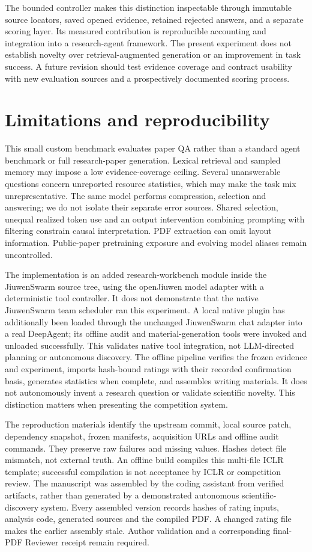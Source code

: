 \documentclass{article}
\begin{document}
The bounded controller makes this distinction inspectable through immutable source locators, saved opened evidence, retained rejected answers, and a separate scoring layer. Its measured contribution is reproducible accounting and integration into a research-agent framework. The present experiment does not establish novelty over retrieval-augmented generation or an improvement in task success. A future revision should test evidence coverage and contract usability with new evaluation sources and a prospectively documented scoring process.

\section{Limitations and reproducibility}
This small custom benchmark evaluates paper QA rather than a standard agent benchmark or full research-paper generation. Lexical retrieval and sampled memory may impose a low evidence-coverage ceiling. Several unanswerable questions concern unreported resource statistics, which may make the task mix unrepresentative. The same model performs compression, selection and answering; we do not isolate their separate error sources. Shared selection, unequal realized token use and an output intervention combining prompting with filtering constrain causal interpretation. PDF extraction can omit layout information. Public-paper pretraining exposure and evolving model aliases remain uncontrolled.

The implementation is an added research-workbench module inside the JiuwenSwarm source tree, using the openJiuwen model adapter with a deterministic tool controller. It does not demonstrate that the native JiuwenSwarm team scheduler ran this experiment. A local native plugin has additionally been loaded through the unchanged JiuwenSwarm chat adapter into a real DeepAgent; its offline audit and material-generation tools were invoked and unloaded successfully. This validates native tool integration, not LLM-directed planning or autonomous discovery. The offline pipeline verifies the frozen evidence and experiment, imports hash-bound ratings with their recorded confirmation basis, generates statistics when complete, and assembles writing materials. It does not autonomously invent a research question or validate scientific novelty. This distinction matters when presenting the competition system.

The reproduction materials identify the upstream commit, local source patch, dependency snapshot, frozen manifests, acquisition URLs and offline audit commands. They preserve raw failures and missing values. Hashes detect file mismatch, not external truth. An offline build compiles this multi-file ICLR template; successful compilation is not acceptance by ICLR or competition review. The manuscript was assembled by the coding assistant from verified artifacts, rather than generated by a demonstrated autonomous scientific-discovery system. Every assembled version records hashes of rating inputs, analysis code, generated sources and the compiled PDF. A changed rating file makes the earlier assembly stale. Author validation and a corresponding final-PDF Reviewer receipt remain required.
\end{document}
